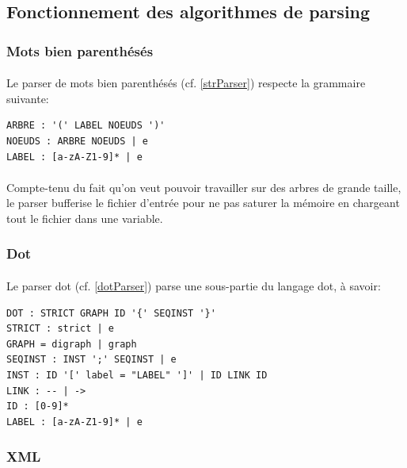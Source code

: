 

	\subsection{Fonctionnement des algorithmes de parsing}

		\subsubsection*{Mots bien parenthésés}
		
\paragraph{}Le parser de mots bien parenthésés (cf. \ref{strParser}) respecte la grammaire suivante:
		
\begin{verbatim}
ARBRE : '(' LABEL NOEUDS ')'
NOEUDS : ARBRE NOEUDS | e
LABEL : [a-zA-Z1-9]* | e
\end{verbatim}

\paragraph{} Compte-tenu du fait qu'on veut pouvoir travailler sur des arbres de grande taille, le parser bufferise le fichier d'entrée pour ne pas saturer la mémoire en chargeant tout le fichier dans une variable.

		\subsubsection*{Dot}
		
\paragraph{}Le parser dot (cf. \ref{dotParser}) parse une sous-partie du langage dot, à savoir:

\begin{verbatim}
DOT : STRICT GRAPH ID '{' SEQINST '}'
STRICT : strict | e
GRAPH = digraph | graph
SEQINST : INST ';' SEQINST | e
INST : ID '[' label = "LABEL" ']' | ID LINK ID
LINK : -- | ->
ID : [0-9]*
LABEL : [a-zA-Z1-9]* | e
\end{verbatim}

		\subsubsection*{XML}
		
